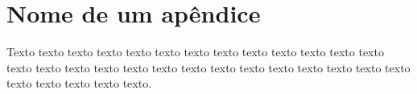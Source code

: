 
\chapter{Nome de um apêndice}
\label{ape:nome}

Texto texto texto texto texto texto texto texto texto texto texto texto texto
texto texto texto texto texto texto texto texto texto texto texto texto texto
texto texto texto texto texto texto.


\singlespacing

\renewcommand{\arraystretch}{0.85}
\captionsetup{margin=1.0cm}  %

